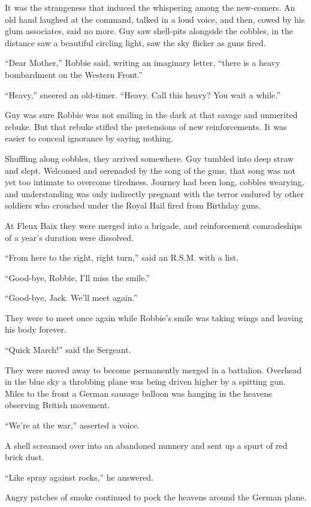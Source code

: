It was the strangeness that induced the whispering among the new-comers. An old hand 
laughed at the command, talked in a loud voice, and then, cowed by his glum associates, 
said no more. Guy saw shell-pits alongside the cobbles, in the distance saw a beautiful 
circling light, saw the sky flicker as guns fired.

``Dear Mother,'' Robbie said, writing an imaginary letter, ``there is a heavy bombardment 
on the Western Front.''

``Heavy,'' sneered an old-timer. ``Heavy. Call this heavy? You wait a while.''

Guy was sure Robbie was not smiling in the dark at that savage and unmerited rebuke. But 
that rebuke stifled the pretensions of new reinforcements. It was easier to conceal ignorance 
by saying nothing.

Shuffling along cobbles, they arrived somewhere. Guy tumbled into deep straw and slept. 
Welcomed and serenaded by the song of the guns, that song was not yet too intimate to 
overcome tiredness. Journey had been long, cobbles wearying, and understanding was only 
indirectly pregnant with the terror endured by other soldiers who crouched under the 
Royal Hail fired from Birthday guns.

At Fleux Baix they were merged into a brigade, and reinforcement comradeships of a year's 
duration were dissolved.

``From here to the right, right turn,'' said an R.S.M. with a list.

``Good-bye, Robbie, I'll miss the smile.''

``Good-bye, Jack. We'll meet again.''

They were to meet once again while Robbie's smile was taking wings and leaving his body forever.

``Quick March!'' said the Sergeant.

They were moved away to become permanently merged in a battalion. Overhead in the blue sky a throbbing 
plane was being driven higher by a spitting gun. Miles to the front a German sausage balloon was 
hanging in the heavens observing British movement.

``We're at the war,'' asserted a voice.

A shell screamed over into an abandoned nunnery and sent up a spurt of red brick dust.

``Like spray against rocks,'' he answered.

Angry patches of smoke continued to pock the heavens around the German plane.

